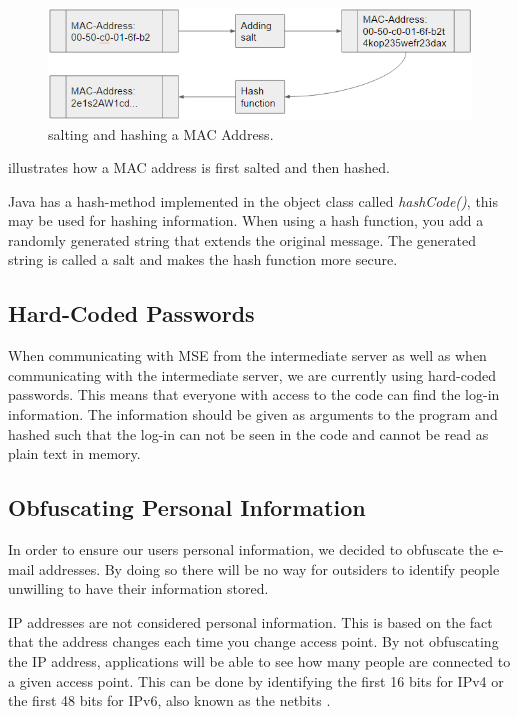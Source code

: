 \begin{figure}[ht]
	\begin{center}
		\includegraphics[scale=0.9]{graphics/salt.png}
		\caption{salting and hashing a MAC Address.}
		\label{fig:salt}
	\end{center} 
\end{figure}

 illustrates how a MAC address is first salted and then hashed.

Java has a hash-method implemented in the object class called \textit{hashCode()}, this may be used for hashing information. When using a hash function, you add a randomly generated string that extends the original message. The generated string is called a salt and makes the hash function more secure.

\subsection*{Hard-Coded Passwords}
When communicating with MSE from the intermediate server as well as when communicating with the intermediate server, we are currently using hard-coded passwords. This means that everyone with access to the code can find the log-in information. The information should be given as arguments to the program and hashed such that the log-in can not be seen in the code and cannot be read as plain text in memory. 

 
\subsection*{Obfuscating Personal Information}
In order to ensure our users personal information, we decided to obfuscate the e-mail addresses. By doing so there will be no way for outsiders to identify people unwilling to have their information stored.

IP addresses are not considered personal information. This is based on the fact that the address changes each time you change access point. By not obfuscating the IP address, applications will be able to see how many people are connected to a given access point. This can be done by identifying the first 16 bits for IPv4 or the first 48 bits for IPv6, also known as the netbits \cite{IPnetworkID}.